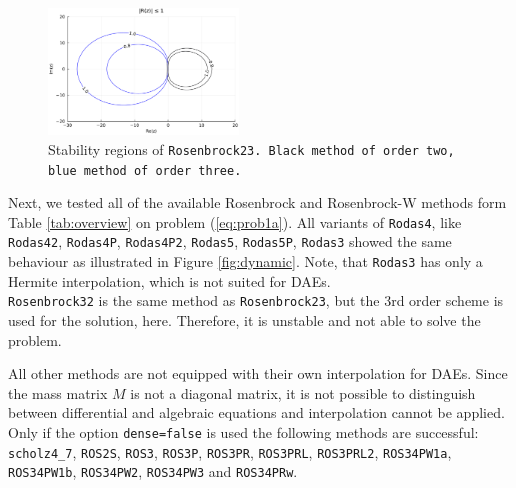 \documentclass{juliacon}
\begin{document}
\begin{figure}[t]
 \centering
 \includegraphics[width=0.45\textwidth]{stability_rosenbrock23.pdf}
 \caption{Stability regions of \tt Rosenbrock23\rm. Black method of order two, blue method of order three.}\label{fig:stability}
\end{figure}

Next, we tested all of the available Rosenbrock and Rosenbrock-W methods form Table \ref{tab:overview} on problem (\ref{eq:prob1a}).
All variants of \verb|Rodas4|, like \verb|Rodas42|, \verb|Rodas4P|, \verb|Rodas4P2|, \verb|Rodas5|, 
\verb|Rodas5P|, \verb|Rodas3| showed the same behaviour as illustrated in Figure \ref{fig:dynamic}.
Note, that \verb|Rodas3| has only a Hermite interpolation, which is not suited for DAEs.\\

\verb|Rosenbrock32| is the same method as \verb|Rosenbrock23|, but the 3rd order scheme is used for the solution, here. Therefore, it is 
unstable and not able to solve the problem.

All other methods are not equipped with their own interpolation for DAEs. Since the mass matrix $M$ is not a diagonal matrix, 
it is not possible to distinguish between differential and algebraic equations and interpolation cannot be applied.
Only if the option \verb|dense=false| is used the following methods are successful:
\verb|scholz4_7|, \verb|ROS2S|, \verb|ROS3|, \verb|ROS3P|,  \verb|ROS3PR|, \verb|ROS3PRL|, \verb|ROS3PRL2|, \verb|ROS34PW1a|, \verb|ROS34PW1b|, \verb|ROS34PW2|, 
\verb|ROS34PW3| and \verb|ROS34PRw|. 
\end{document}
